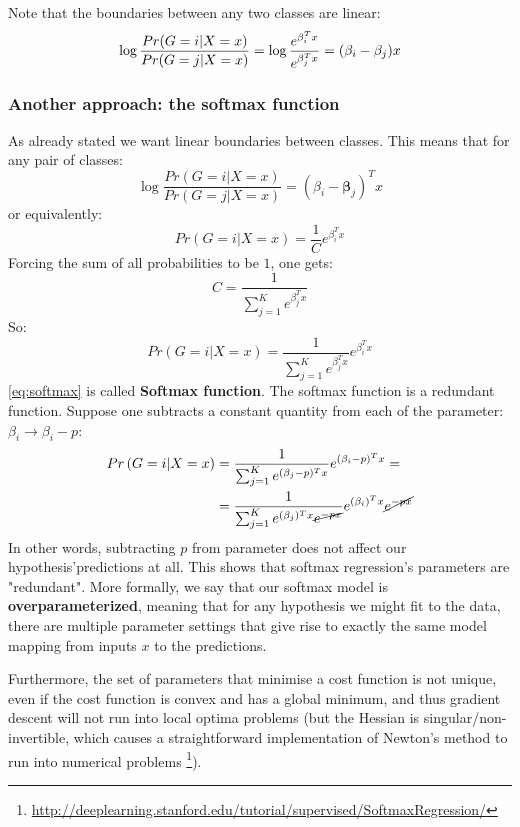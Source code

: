\documentclass[12pt, letterpaper]{article}
\theoremstyle{definition}
\newcommand{\be}{\mathbf{\beta}}
\DeclarePairedDelimiter\autobracket{(}{)}
\newcommand{\br}[1]{\autobracket*{#1}}
\let\tb\textbf
\begin{document}
Note that the boundaries between any two classes are linear:
\begin{equation*}
\log \frac{Pr(G=i|X=x)}{Pr(G=j|X=x)} = \log \frac{e^{\beta_i^T x}}{e^{\beta_j^T x}} = \br{\beta_i -\beta_j}x
\end{equation*}

\subsubsection{Another approach: the softmax function}
\label{sssec:softmax}
As already stated we want linear boundaries between classes. This means that for any pair of classes:
\begin{equation}
\log \frac{Pr\left(G=i|X=x\right)}{Pr\left(G=j|X=x\right)} = (\beta_i - \be_j)^T x 
\end{equation}
or equivalently:
\begin{equation}
Pr\left(G=i|X=x\right) = \frac{1}{C}e^{\beta_i ^T x }
\end{equation}
Forcing the sum of all probabilities to be $1$, one gets:
\begin{equation}
C= \frac{1}{\sum_{j=1}^Ke^{\beta_j ^T x }}
\end{equation}
So:
\begin{equation}
Pr\left(G=i|X=x\right) = \frac{1}{\sum_{j=1}^Ke^{\beta_j ^T x}}e^{\beta_i ^T x }
\label{eq:softmax}
\end{equation}
\autoref{eq:softmax} is called \tb{Softmax function}. 
The softmax function is a redundant function. Suppose one subtracts a constant quantity from each of the parameter: $\beta_i \rightarrow \beta_i - p$:
\begin{equation}
\begin{aligned}
Pr\left(G=i|X=x\right) &= \frac{1}{\sum_{j=1}^Ke^{(\beta_j-p) ^T x}}e^{(\beta_i-p)  ^T x } =\\
&= \frac{1}{\sum_{j=1}^Ke^{(\beta_j) ^T x}\cancel{e^{-px}}}e^{(\beta_i)  ^T x }\cancel{e^{-px}}
\end{aligned}
\end{equation}
In other words, subtracting $p$ from parameter does not affect our hypothesis'predictions at all. This shows that softmax regression's parameters are "redundant". More formally, we say that our softmax model is \tb{overparameterized}, meaning that for any hypothesis we might fit to the data, there are multiple parameter settings that give rise to exactly the same model mapping from inputs $x$ to the predictions.

Furthermore, the set of parameters that minimise a cost function is not unique, even if the cost function is convex and has a global minimum, and thus gradient descent will not run into local optima problems (but the Hessian is singular/non-invertible, which causes a straightforward implementation of Newton’s method to run into numerical problems \footnote{\url{http://deeplearning.stanford.edu/tutorial/supervised/SoftmaxRegression/}}).
\end{document}
